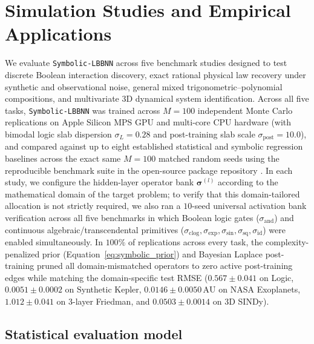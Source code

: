 \documentclass[11pt,a4paper]{article}
\begin{document}
\section{Simulation Studies and Empirical Applications}
\label{sec:experiments}

We evaluate \texttt{Symbolic-LBBNN} across five benchmark studies designed to test discrete Boolean interaction discovery, exact rational physical law recovery under synthetic and observational noise, general mixed trigonometric--polynomial compositions, and multivariate 3D dynamical system identification. Across all five tasks, \texttt{Symbolic-LBBNN} was trained across $M = 100$ independent Monte Carlo replications on Apple Silicon MPS GPU and multi-core CPU hardware (with bimodal logic slab dispersion $\sigma_L = 0.28$ and post-training slab scale $\sigma_{\text{post}} = 10.0$), and compared against up to eight established statistical and symbolic regression baselines across the exact same $M = 100$ matched random seeds using the reproducible benchmark suite in the open-source package repository \citep{skaaret2026lbbnn, hubin2026symbolicrepo}. In each study, we configure the hidden-layer operator bank $\bm{\sigma}^{(l)}$ according to the mathematical domain of the target problem; to verify that this domain-tailored allocation is not strictly required, we also ran a $10$-seed universal activation bank verification across all five benchmarks in which Boolean logic gates ($\sigma_{\text{and}}$) and continuous algebraic/transcendental primitives ($\sigma_{\text{clog}}, \sigma_{\exp}, \sigma_{\sin}, \sigma_{\text{sq}}, \sigma_{\text{id}}$) were enabled simultaneously. In $100\%$ of replications across every task, the complexity-penalized prior (Equation~\eqref{eq:symbolic_prior}) and Bayesian Laplace post-training pruned all domain-mismatched operators to zero active post-training edges while matching the domain-specific test RMSE ($0.567 \pm 0.041$ on Logic, $0.0051 \pm 0.0002$ on Synthetic Kepler, $0.0146 \pm 0.0050\,\text{AU}$ on NASA Exoplanets, $1.012 \pm 0.041$ on 3-layer Friedman, and $0.0503 \pm 0.0014$ on 3D SINDy).

\subsection{Statistical evaluation model}
\label{sec:exp:glmm}
\end{document}
